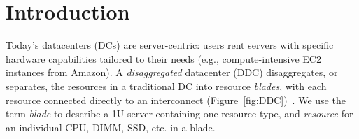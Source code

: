 
\section{Introduction} 
\label{sec:intro}
Today's datacenters (DCs) are server-centric: users rent servers with
specific hardware capabilities tailored to their needs (e.g.,
compute-intensive EC2 instances from Amazon). 
A \emph{disaggregated} datacenter (DDC) disaggregates, or separates,
the resources in a traditional DC into resource \emph{blades},
with each resource connected directly to an interconnect (Figure~\ref{fig:DDC})~\cite{Han2013,Gao2016}. 
We use the term \emph{blade} to describe a 1U server containing one resource
type, and \emph{resource} for an individual CPU, DIMM, SSD, etc. in a blade. 






